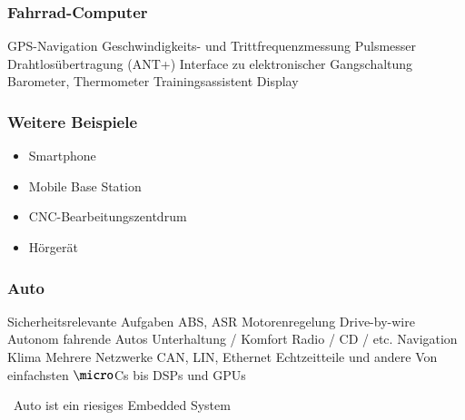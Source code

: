 \begin{minipage}[t]{0.48\columnwidth}
    \raggedright
    \subsubsection*{Fahrrad-Computer}

    \begin{outline}
        \1 GPS-Navigation
        \1 Geschwindigkeits- und Trittfrequenzmessung
        \1 Pulsmesser
        \1 Drahtlosübertragung (ANT+)
        \1 Interface zu elektronischer Gangschaltung
        \1 Barometer, Thermometer
        \1 Trainingsassistent
        \1 Display
    \end{outline}

    \subsubsection*{Weitere Beispiele}

    \begin{itemize}
        \item Smartphone
        \item Mobile Base Station
        \item CNC-Bearbeitungszentdrum
        \item Hörgerät
    \end{itemize}
\end{minipage}
\hfill
\begin{minipage}[t]{0.48\columnwidth}
    \raggedright
    \subsubsection*{Auto}

    \begin{outline}
        \1 Sicherheitsrelevante Aufgaben
            \2 ABS, ASR
            \2 Motorenregelung
            \2 Drive-by-wire
            \2 Autonom fahrende Autos
        \1 Unterhaltung / Komfort
            \2 Radio / CD / etc.
            \2 Navigation
            \2 Klima
        \1 Mehrere Netzwerke
            \2 CAN, LIN, Ethernet
        \1 Echtzeitteile und andere
        \1 Von einfachsten $\micro$Cs bis DSPs und GPUs 
    \end{outline}

    \textrightarrow\ Auto ist ein riesiges Embedded System
\end{minipage}



